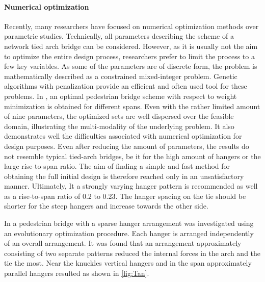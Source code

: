 \paragraph*{Numerical optimization}
Recently, many researchers have focused on numerical optimization methods over parametric studies. Technically, all parameters describing the scheme of a network tied arch bridge can be considered. However, as it is usually not the aim to optimize the entire design process, researchers prefer to limit the process to a few key variables. As some of the parameters are of discrete form, the problem is mathematically described as a constrained mixed-integer problem. Genetic algorithms with penalization provide an efficient and often used tool for these problems. In \citep{Belevicius}, an optimal pedestrian bridge scheme with respect to weight minimization is obtained for different spans. Even with the rather limited amount of nine parameters, the optimized sets are well dispersed over the feasible domain, illustrating the multi-modality of the underlying problem.
It also demonstrates well the difficulties associated with numerical optimization for design purposes. Even after reducing the amount of parameters, the results do not resemble typical tied-arch bridges, be it for the high amount of hangers or the large rise-to-span ratio. The aim of finding a simple and fast method for obtaining the full initial design is therefore reached only in an unsatisfactory manner. Ultimately, It a strongly varying hanger pattern is recommended as well as a rise-to-span ratio of 0.2 to 0.23. The hanger spacing on the tie should be shorter for the steep hangers and increase towards the other side.\bigskip

In \citep{Tan} a pedestrian bridge with a sparse hanger arrangement was investigated using an evolutionary optimization procedure. Each hanger is arranged independently of an overall arrangement. It was found that an arrangement approximately consisting of two separate patterns reduced the internal forces in the arch and the tie the most. Near the knuckles vertical hangers and in the span approximately parallel hangers resulted as shown in \autoref{fig:Tan}.


